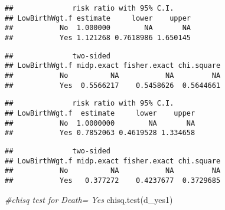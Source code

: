 \documentclass[
]{article}
\newenvironment{Shaded}{\begin{snugshade}}{\end{snugshade}}
\newcommand{\CommentTok}[1]{\textcolor[rgb]{0.56,0.35,0.01}{\textit{#1}}}
\newcommand{\FunctionTok}[1]{\textcolor[rgb]{0.00,0.00,0.00}{#1}}
\newcommand{\NormalTok}[1]{#1}
\newcommand{\OtherTok}[1]{\textcolor[rgb]{0.56,0.35,0.01}{#1}}
\newcommand{\SpecialCharTok}[1]{\textcolor[rgb]{0.00,0.00,0.00}{#1}}
\begin{document}
\begin{verbatim}
##              risk ratio with 95% C.I.
## LowBirthWgt.f estimate     lower    upper
##           No  1.000000        NA       NA
##           Yes 1.121268 0.7618986 1.650145
\end{verbatim}

\begin{Shaded}
\end{Shaded}

\begin{verbatim}
##              two-sided
## LowBirthWgt.f midp.exact fisher.exact chi.square
##           No          NA           NA         NA
##           Yes  0.5566217    0.5458626  0.5644661
\end{verbatim}

\begin{Shaded}
\end{Shaded}

\begin{verbatim}
##              risk ratio with 95% C.I.
## LowBirthWgt.f  estimate     lower    upper
##           No  1.0000000        NA       NA
##           Yes 0.7852063 0.4619528 1.334658
\end{verbatim}

\begin{Shaded}
\end{Shaded}

\begin{verbatim}
##              two-sided
## LowBirthWgt.f midp.exact fisher.exact chi.square
##           No          NA           NA         NA
##           Yes   0.377272    0.4237677  0.3729685
\end{verbatim}

\begin{Shaded}
\begin{Highlighting}[]
\CommentTok{\#chisq test for Death= Yes}
\FunctionTok{chisq.test}\NormalTok{(d\_yes1)}
\end{Highlighting}
\end{Shaded}
\end{document}

